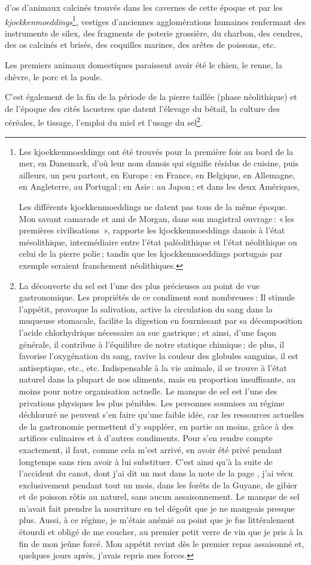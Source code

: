 d'os d'animaux calcinés trouvés dans les cavernes de cette époque et par les
\textit{kjoekkenmoeddings}\footnote{ Les kjoekkenmoeddings ont été trouvés pour
la première fois au bord de la mer, en Danemark, d'où leur nom danois qui
signifie résidus de cuisine, puis ailleurs, un peu partout, en Europe : en
France, en Belgique, en Allemagne, en Angleterre, au Portugal ; en Asie : au
Japon ; et dans les deux Amériques,

Les différents kjockkenmoeddings ne datent pas tous de la même époque. Mon
savant camarade et ami de Morgan, dans son magistral ouvrage : « les premières
civilisations  », rapporte les kjockkenmoeddings danois à l'état mésolithique,
intermédiaire entre l'état paléolithique et l'état néolithique ou celui de la
pierre polie ; tandis que les kjockkenmoeddings portugais par exemple seraient
franchement néolithiques. }, vestiges d'anciennes agglomérations humaines
renfermant des instruments de silex, des fragments de poterie grossière, du
charbon, des cendres, des os calcinés et brisés, des coquilles marines, des
arêtes de poissons, etc.

Les premiers animaux domestiques paraissent avoir été le chien, le renne, la
chèvre, le porc et la poule.

C'est également de la fin de la période de la pierre taillée (phase
néolithique) et de l'époque des cités lacustres que datent l'élevage du bétail,
la culture des céréales, le tissage, l'emploi du miel et l'usage du
sel\footnote{La découverte du sel est l’une des plus précieuses au point de vue
gastronomique. Les propriétés de ce condiment sont nombreuses : Il stimule
l'appétit, provoque la salivation, active la circulation du sang dans la
muqueuse stomacale, facilite la digestion en fournissant par sa décomposition
l'acide chlorhydrique nécessaire au suc gastrique ; et ainsi, d'une façon
générale, il contribue à l'équilibre de notre statique chimique ; de plus, il
favorise l'oxygénation du sang, ravive la couleur des globules sanguins, il est
antiseptique, etc., etc. Indispensable à la vie animale, il se trouve à l'état
naturel dans la plupart de nos aliments, mais en proportion insuffisante, au
moins pour notre organisation actuelle. Le manque de sel est l'une des
privations physiques les plus pénibles. Les personnes soumises au régime
déchloruré ne peuvent s'en faire qu'une faible idée, car les ressources
actuelles de la gastronomie permettent d'y suppléer, en partie au moins, grâce
à des artifices culinaires et à d'autres condiments. Pour s'en rendre compte
exactement, il faut, comme cela m'est arrivé, en avoir été privé pendant
longtemps sans rien avoir à lui substituer. C'est ainsi qu'à la suite de
l'accident du canot, dont j'ai dit un mot dans la note {\mmm} de la page
{\mmm}, j'ai vécu exclusivement pendant tout un mois, dans les forêts de
la Guyane, de gibier et de poisson rôtis au naturel, sans aucun assaisonnement.
Le manque de sel m'avait fait prendre la nourriture en tel dégoût que je ne
mangeais presque plus. Aussi, à ce régime, je m'étais anémié au point que je
fus littéralement étourdi et obligé de me coucher, au premier petit verre de
vin que je pris à la fin de mon jeûne forcé. Mon appétit revint dès le premier
repas assaisonné et, quelques jours après, j'avais repris mes forces.}.

